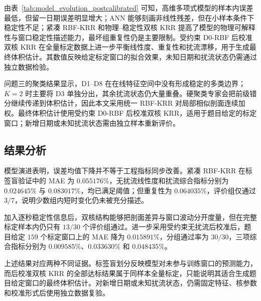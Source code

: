 由表~\ref{tab:model_evolution_postcalibrated} 可知，高维多项式模型的样本内误差最低，但留一日期误差明显增大；ANN 能够刻画非线性残差，但在小样本条件下稳定性不足；紧凑 RBF-KRR 和物理--稳定性双核 KRR 提高了模型的物理可解释性与窗口稳定性描述能力，最坏组重复性仍是主要限制。受约束 D0-RBF 后校准双核 KRR 在全量标定数据上进一步平衡线性度、重复性和扰流漂移，用于生成最终体积估计。其数值反映给定标定窗口的拟合效果，未知日期和扰流状态仍需通过独立数据检验。

问题三的聚类结果显示，D1--D8 在在线特征空间中没有形成稳定的多类边界；$K=2$ 时主要将 D3 单独分出，其余扰流状态仍大量重叠。硬聚类专家会把前级错分继续传递到体积估计，因此本文采用统一 RBF-KRR 对局部相似剖面连续加权。最终体积估计使用受约束 D0-RBF 后校准双核 KRR，适用于题目给定的标定窗口；新增日期或未知扰流状态需由独立样本重新评价。

\subsection{结果分析}

模型演进表明，误差均值下降并不等于工程指标同步改善。紧凑 RBF-KRR 在标签盲验证中的 MAE 为 $0.055176\%$，无扰流线性度和扰流综合指标分别为 $0.024645\%$ 与 $0.083017\%$，均已满足阈值；但重复性为 $0.064035\%$，评价组仅通过 $3/7$，说明少数组内短时变化仍未被充分描述。

加入逐秒稳定性信息后，双核结构能够把剖面差异与窗口波动分开度量，但在完整标定样本内仍只有 $13/30$ 个评价组通过。进一步采用受约束无扰流后校准后，题目给定 $159$ 个标定窗口上的 MAE 降为 $0.015891\%$，分组通过率为 $30/30$，三项综合指标分别为 $0.009585\%$、$0.033630\%$ 和 $0.048435\%$。

上述结果对应两种不同证据。标签盲划分反映模型对未参与训练窗口的预测能力，而后校准双核 KRR 的全部达标结果属于同样本全量标定，只能说明其适合生成题目给定窗口的最终体积估计。对新增日期或未知扰流状态，仍需固定特征、核参数和校准形式后使用独立数据复验。
